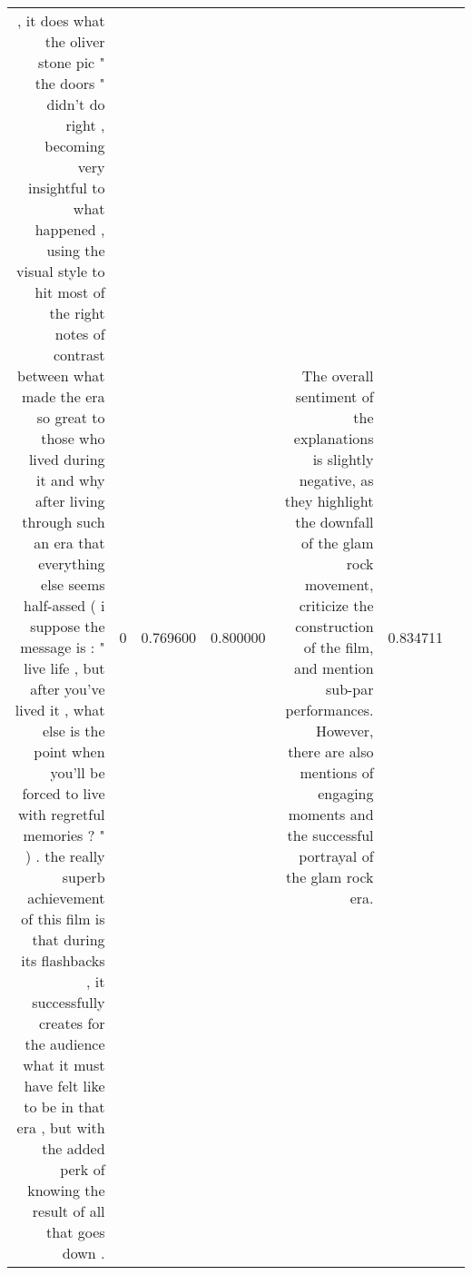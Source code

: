 \begin{tabular}{rlrrrlr}
, it does what the oliver stone pic " the doors " didn't do right , becoming very insightful to what happened , using the visual style to hit most of the right notes of contrast between what made the era so great to those who lived during it and why after living through such an era that everything else seems half-assed ( i suppose the message is : " live life , but after you've lived it , what else is the point when you'll be forced to live with regretful memories ? " ) .  the really superb achievement of this film is that during its flashbacks , it successfully creates for the audience what it must have felt like to be in that era , but with the added perk of knowing the result of all that goes down .   & 0 & 0.769600 & 0.800000 & The overall sentiment of the explanations is slightly negative, as they highlight the downfall of the glam rock movement, criticize the construction of the film, and mention sub-par performances. However, there are also mentions of engaging moments and the successful portrayal of the glam rock era. & 0.834711 \\

\end{tabular}
